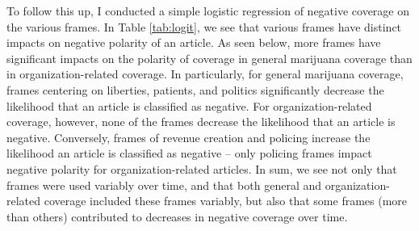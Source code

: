 To follow this up, I conducted a simple logistic regression of negative coverage on the various frames. In Table \ref{tab:logit}, we see that various frames have distinct impacts on negative polarity of an article. As seen below, more  frames have significant impacts on the polarity of coverage in general marijuana coverage than in organization-related coverage. In particularly, for general marijuana coverage, frames centering on liberties, patients, and politics significantly decrease the likelihood that an article is classified as negative. For organization-related coverage, however, none of the frames decrease the likelihood that an article is negative. Conversely, frames of revenue creation and policing increase the likelihood an article is classified as negative -- only policing frames impact negative polarity for organization-related articles. In sum, we see not only that frames were used variably over time, and that both general and organization-related coverage included these frames variably, but also that some frames (more than others) contributed to decreases in negative coverage over time. 






%


